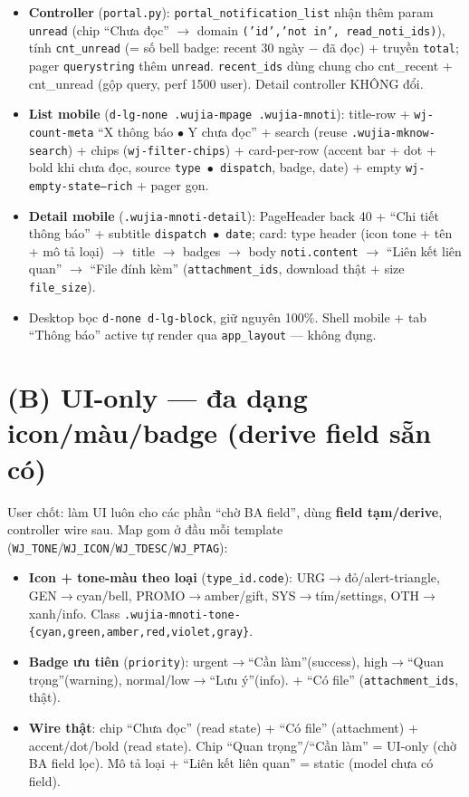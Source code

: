 \begin{itemize}
  \item \textbf{Controller} (\texttt{portal.py}): \texttt{portal\_notification\_list} nhận thêm param
        \texttt{unread} (chip ``Chưa đọc'' $\rightarrow$ domain \texttt{('id','not in', read\_noti\_ids)}),
        tính \texttt{cnt\_unread} (= số bell badge: recent 30 ngày $-$ đã đọc) + truyền \texttt{total};
        pager \texttt{querystring} thêm \texttt{unread}. \texttt{recent\_ids} dùng chung cho cnt\_recent +
        cnt\_unread (gộp query, perf 1500 user). Detail controller KHÔNG đổi.
  \item \textbf{List mobile} (\texttt{d-lg-none .wujia-mpage .wujia-mnoti}): title-row + \texttt{wj-count-meta}
        ``X thông báo $\bullet$ Y chưa đọc'' + search (reuse \texttt{.wujia-mknow-search}) + chips
        (\texttt{wj-filter-chips}) + card-per-row (accent bar + dot + bold khi chưa đọc, source
        \texttt{type $\bullet$ dispatch}, badge, date) + empty \texttt{wj-empty-state--rich} + pager gọn.
  \item \textbf{Detail mobile} (\texttt{.wujia-mnoti-detail}): PageHeader back 40 + ``Chi tiết thông báo'' +
        subtitle \texttt{dispatch $\bullet$ date}; card: type header (icon tone + tên + mô tả loại) $\to$
        title $\to$ badges $\to$ body \texttt{noti.content} $\to$ ``Liên kết liên quan'' $\to$ ``File đính
        kèm'' (\texttt{attachment\_ids}, download thật + size \texttt{file\_size}).
  \item Desktop bọc \texttt{d-none d-lg-block}, giữ nguyên 100\%. Shell mobile + tab ``Thông báo'' active
        tự render qua \texttt{app\_layout} --- không đụng.
\end{itemize}

\section{(B) UI-only --- đa dạng icon/màu/badge (derive field sẵn có)}

User chốt: làm UI luôn cho các phần ``chờ BA field'', dùng \textbf{field tạm/derive}, controller wire sau.
Map gom ở đầu mỗi template (\texttt{WJ\_TONE}/\texttt{WJ\_ICON}/\texttt{WJ\_TDESC}/\texttt{WJ\_PTAG}):

\begin{itemize}
  \item \textbf{Icon + tone-màu theo loại} (\texttt{type\_id.code}): URG$\to$đỏ/alert-triangle,
        GEN$\to$cyan/bell, PROMO$\to$amber/gift, SYS$\to$tím/settings, OTH$\to$xanh/info. Class
        \texttt{.wujia-mnoti-tone-\{cyan,green,amber,red,violet,gray\}}.
  \item \textbf{Badge ưu tiên} (\texttt{priority}): urgent$\to$``Cần làm''(success), high$\to$``Quan
        trọng''(warning), normal/low$\to$``Lưu ý''(info). + ``Có file'' (\texttt{attachment\_ids}, thật).
  \item \textbf{Wire thật}: chip ``Chưa đọc'' (read state) + ``Có file'' (attachment) + accent/dot/bold
        (read state). Chip ``Quan trọng''/``Cần làm'' = UI-only (chờ BA field lọc). Mô tả loại + ``Liên
        kết liên quan'' = static (model chưa có field).
\end{itemize}

